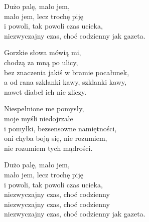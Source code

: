 \begin{text}
    Dużo palę, mało jem,\\
    mało jem, lecz trochę piję\\
    i powoli, tak powoli czas ucieka,\\
    niezwyczajny czas, choć codzienny jak gazeta.

    Gorzkie słowa mówią mi,\\
    chodzą za mną po ulicy,\\
    bez znaczenia jakiś w bramie pocałunek,\\
    a od rana szklanki kawy, szklanki kawy,\\
    nawet diabeł ich nie zliczy.

    Niespełnione me pomysły,\\
    moje myśli niedojrzałe\\
    i pomyłki, bezsensowne namiętności,\\
    oni chyba boją się, nie rozumiem,\\
    nie rozumiem tych mądrości.

    Dużo palę, mało jem,\\
    mało jem, lecz trochę piję\\
    i powoli, tak powoli czas ucieka,\\
    niezwyczajny czas, choć codzienny\\
    niezwyczajny czas, choć codzienny\\
    niezwyczajny czas, choć codzienny jak gazeta.
\end{text}
\begin{chord}

\end{chord}